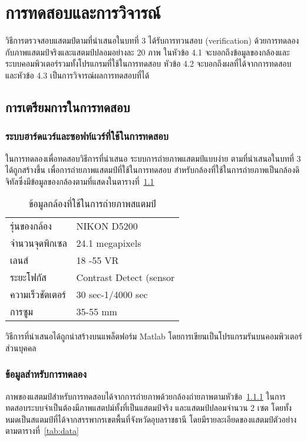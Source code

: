\chapter{การทดสอบและการวิจารณ์}
\label{ch:results}
วิธีการตรวจสอบแสตมป์ตามที่นำเสนอในบทที่ 3 ได้รับการทวนสอบ (verification) ด้วยการทดลองกับภาพแสตมป์จริงและแสตมป์ปลอมอย่างละ 20 ภาพ ในหัวข้อ 4.1 จะบอกถึงข้อมูลของกล้องและระบบคอมพิวเตอร์รวมทั้งโปรแกรมที่ใช้ในการทดสอบ หัวข้อ 4.2 จะบอกถึงผลที่ได้จากการทดสอบ และหัวข้อ 4.3 เป็นการวิจารณ์ผลการทดสอบที่ได้


\section{การเตรียมการในการทดสอบ}
 \subsection{ระบบฮาร์ดแวร์และซอฟท์แวร์ที่ใช้ในการทดสอบ} 
 \label{sec:setup}
ในการทดลองเพื่อทดสอบวิธีการที่นำเสนอ ระบบการถ่ายภาพแสตมป์แบบง่าย ตามที่นำเสนอในบทที่ 3 ได้ถูกสร้างขึ้น เพื่อการถ่ายภาพแสตมป์ที่ใช้ในการทดสอบ สำหรับกล้องที่ใช้ในการถ่ายภาพเป็นกล้องดิจิทัลซึ่งมีข้อมูลของกล้องตามที่แสดงในตารางที่~\ref{tab:camera}

\begin{table}[htb]
\caption{ข้อมูลกล้องที่ใช้ในการถ่ายภาพสแตมป์}
\label{tab:camera}
\begin{tabular}{ll}
\hline
รุ่นของกล้อง            &NIKON D5200\\
จำนวนจุดพิกเซล      &24.1 megapixels\\
เลนส์                    &18 -55 VR\\
ระยะโฟกัส             &Contrast Detect (sensor\\
ความเร็วชัตเตอร์      &30 sec-1/4000 sec\\
การซูม                  &35-55 mm\\
\hline
\end{tabular}
\end{table} 


วิธีการที่นำเสนอได้ถูกนำสร้างบนแพล็ตฟอร์ม Matlab โดยการเขียนเป็นโปรแกรมรันบนคอมพิวเตอร์ส่วนบุคคล

\subsection{ข้อมูลสำหรับการทดลอง}
ภาพของแสตมป์สำหรับการทดสอบได้จากการถ่ายภาพด้วยกล้องถ่ายภาพตามหัวข้อ~\ref{sec:setup} ในการทดสอบระบบจำเป็นต้องมีภาพแสตปม์ทั้งที่เป็นแสตมป์จริง และแสตมป์ปลอมจำนวน 2 เซต โดยทั้งหมดเป็นสแตมป์ที่ได้จากสรรพากรเขตพื้นที่จังหวัดอุบลราชธานี โดยมีรายละเอียดของแสตมป์ตัวอย่างตามตารางที่~\ref{tab:data}

